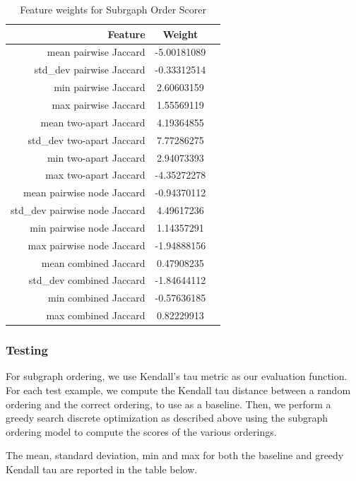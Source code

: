 \documentclass[12pt]{article}
\begin{document}
\begin{table}
\centering
\begin{tabular}{|r|c|c|}
\hline
Feature & Weight \\ \hline\hline
mean pairwise Jaccard & -5.00181089 \\ \hline
std\_dev pairwise Jaccard & -0.33312514 \\ \hline
min pairwise Jaccard & 2.60603159 \\ \hline
max pairwise Jaccard & 1.55569119 \\ \hline
mean two-apart Jaccard & 4.19364855 \\ \hline
std\_dev two-apart Jaccard & 7.77286275 \\ \hline
min two-apart Jaccard & 2.94073393 \\ \hline
max two-apart Jaccard & -4.35272278 \\ \hline
mean pairwise node Jaccard & -0.94370112 \\ \hline
std\_dev pairwise node Jaccard & 4.49617236 \\ \hline
min pairwise node Jaccard & 1.14357291 \\ \hline
max pairwise node Jaccard & -1.94888156 \\ \hline
mean combined Jaccard & 0.47908235 \\ \hline
std\_dev combined Jaccard & -1.84644112 \\ \hline
min combined Jaccard & -0.57636185 \\ \hline
max combined Jaccard & 0.82229913 \\ \hline
\end{tabular}
\caption{Feature weights for Subrgaph Order Scorer}
\end{table}

\subsubsection{Testing}

For subgraph ordering, we use Kendall's tau metric as our evaluation function.
For each test example, we compute the Kendall tau distance between a random
ordering and the correct ordering, to use as a baseline. Then, we perform a
greedy search discrete optimization as described above using the subgraph
ordering model to compute the scores of the various orderings.

The mean, standard deviation, min and max for both the baseline and greedy
Kendall tau  are reported in the table below.
\end{document}

